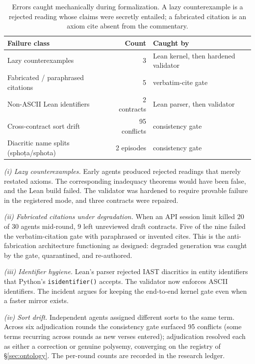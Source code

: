 \documentclass[11pt]{article}
\begin{document}
\begin{table}[t]
\centering
\caption{Errors caught mechanically during formalization. A lazy
counterexample is a rejected reading whose claims were secretly entailed; a
fabricated citation is an axiom cite absent from the commentary.}
\label{tab:catches}
\begin{tabular}{lrl}
\toprule
\textbf{Failure class} & \textbf{Count} & \textbf{Caught by} \\
\midrule
Lazy counterexamples             & 3 & Lean kernel, then hardened validator \\
Fabricated / paraphrased citations & 5 & verbatim-cite gate \\
Non-ASCII Lean identifiers       & 2 contracts & Lean parser, then validator \\
Cross-contract sort drift        & 95 conflicts & consistency gate \\
Diacritic name splits (spho\d{t}a/sphota) & 2 episodes & consistency gate \\
\bottomrule
\end{tabular}
\end{table}

\emph{(i) Lazy counterexamples.} Early agents produced rejected readings
that merely restated axioms. The corresponding inadequacy theorems would
have been false, and the Lean build failed. The validator was hardened to
require provable failure in the registered mode, and three contracts were
repaired.

\emph{(ii) Fabricated citations under degradation.} When an API session
limit killed 20 of 30 agents mid-round, 9 left unreviewed draft contracts.
Five of the nine failed the verbatim-citation gate with paraphrased or
invented cites. This is the anti-fabrication architecture functioning as
designed: degraded generation was caught by the gate, quarantined, and
re-authored.

\emph{(iii) Identifier hygiene.} Lean's parser rejected IAST diacritics in
entity identifiers that Python's \texttt{isidentifier()} accepts. The
validator now enforces ASCII identifiers. The incident argues for keeping
the end-to-end kernel gate even when a faster mirror exists.

\emph{(iv) Sort drift.} Independent agents assigned different sorts to the
same term. Across six adjudication rounds the consistency gate surfaced 95
conflicts (some terms recurring across rounds as new verses entered);
adjudication resolved each as either a correction or genuine polysemy,
converging on the registry of \S\ref{sec:ontology}. The per-round counts are
recorded in the research ledger.
\end{document}
